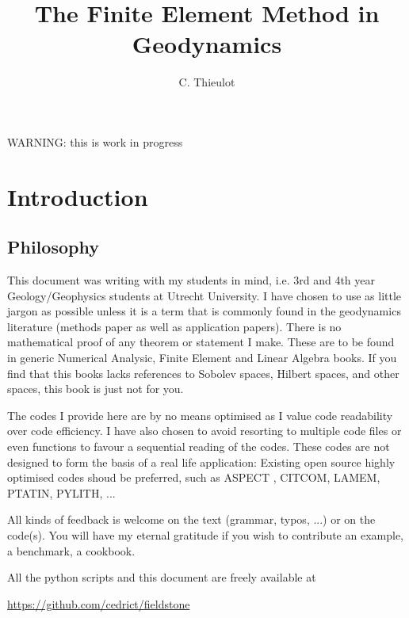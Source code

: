 \documentclass[a4paper]{article}
\title{The Finite Element Method in Geodynamics}
\author{C. Thieulot}
\begin{document}
\maketitle

\tableofcontents

\newpage

\begin{center}
{\color{red} \huge WARNING: this is work in progress}
\end{center}

\section{Introduction}

\subsection{Philosophy} %
This document was writing with my students in mind, i.e. 3rd and 4th year 
Geology/Geophysics students at Utrecht University. 
I have chosen to use as little jargon as possible unless it is a term that is 
commonly found in the geodynamics literature (methods paper as well as 
application papers). There is no mathematical proof of any theorem or statement 
I make. These are to be found in generic Numerical Analysic, Finite Element and 
Linear Algebra books. If you find that this books lacks references
to Sobolev spaces, Hilbert spaces, and other spaces, this book is just not for you.  

The codes I provide here are by no means optimised as I value code readability 
over code efficiency. I have also chosen to avoid resorting to multiple code 
files or even functions to favour a sequential reading of the codes. 
These codes are not designed to form the basis of a real life application:
Existing open source highly optimised codes shoud be preferred, such as 
ASPECT \cite{krhb12,hedg17}, CITCOM, LAMEM, PTATIN, PYLITH, ... 

All kinds of feedback is welcome on the text (grammar, typos, ...) or on the 
code(s). You will have my eternal gratitude if you wish to contribute an 
example, a benchmark, a cookbook. 

All the python scripts and this document are freely available at 
\begin{center}
\url{https://github.com/cedrict/fieldstone}
\end{center}
\end{document}
